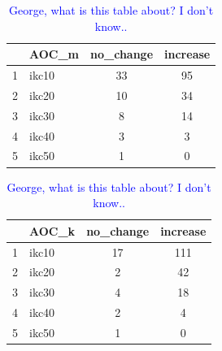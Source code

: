 \documentclass[11pt, oneside]{article}   	%
\begin{document}
\clearpage
\begin{table}[H]
\centering
\begin{tabular}{rlcc}
  \hline
 & AOC\_m & no\_change & increase \\ 
  \hline
1 & ikc10 &  33 &  95 \\ 
2 & ikc20 &  10 &  34 \\ 
3 & ikc30 &   8 &  14 \\ 
4 & ikc40 &   3 &   3 \\ 
5 & ikc50 &   1 &   0 \\ 
   \hline
\end{tabular}
\quad
\begin{tabular}{rlcc}
  \hline
 & AOC\_k& no\_change & increase \\ 
  \hline
1 & ikc10 &  17 & 111 \\ 
2 & ikc20 &   2 &  42 \\ 
3 & ikc30 &   4 &  18 \\ 
4 & ikc40 &   2 &   4 \\ 
5 & ikc50 &   1 &   0 \\ 
   \hline
\end{tabular}
\caption{\textcolor{blue}{George, what is this table about? I don't know..}}
\label{tab:tab1}
\end{table}
\end{document}
